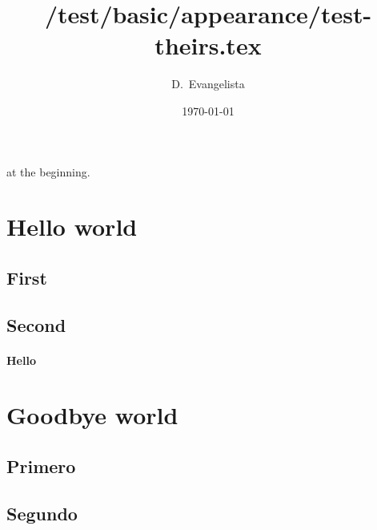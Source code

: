 \documentclass[nols]{tufte-handout}
\title{/test/basic/appearance/test-theirs.tex}
\author{D.~Evangelista}
\date{\today}
\begin{document}
\maketitle

 at the beginning. %

\section{Hello world}
\lipsum[1][1]

\subsection{First}
\lipsum[1][2]

\subsection{Second}
\lipsum[1][3]

\paragraph{Hello} \lipsum[1][4]

\section{Goodbye world}
\lipsum[2][1]

\subsection{Primero}
\lipsum[2][2]

\subsection{Segundo}
\lipsum[2][3]

\begin{fullwidth}
\small\itshape\lipsum[1]
\end{fullwidth}
\end{document}
